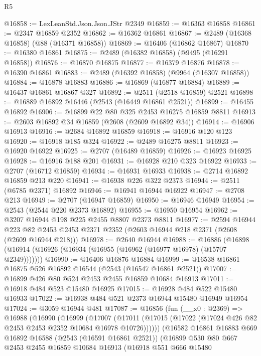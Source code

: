 \begin{lexlean}{R5}
\begin{coremodule}
@16858 := LexLeanStd.Json.Json.JStr @2349
@16859 := @16363 @16858
@16861 := @2347 @16859 @2352
@16862 := @16362 @16861
@16867 := @2489 (@16368 @16858) (@88 (@16371 @16858))
@16869 := @16406 (@16862 @16867)
@16870 := @16380 @16861
@16875 := @2489 (@16382 @16858) (@9495 (@16291 @16858))
@16876 := @16870 @16875
@16877 := @16379 @16876
@16878 := @16390 @16861
@16883 := @2489 (@16392 @16858) (@9964 (@16307 @16858))
@16884 := @16878 @16883
@16886 := @16869 (@16877 @16884)
@16889 := @16437 @16861 @16867 @327
@16892 := @2511 (@2518 @16859) @2521
@16898 := @16889 @16892 @16446 (@2543 (@16449 @16861 @2521))
@16899 := @16455 @16892
@16906 := @16899 @22 @80 @325 @2453 @16275 @16859 @8811
@16913 := @2603 @16892 @34 @16859 (@2608 (@2609 @16892 @34))
@16914 := @16906 @16913
@16916 := @2684 @16892 @16859
@16918 := @16916 @120 @123
@16920 := @16918 @185 @324
@16922 := @2489 @16275 @8811
@16923 := @16920 @16922
@16925 := @2707 (@16489 @16859)
@16926 := @16923 @16925
@16928 := @16916 @188 @201
@16931 := @16928 @210 @323 @16922
@16933 := @2707 (@16712 @16859)
@16934 := @16931 @16933
@16938 := @2714 @16892 @16859 @213 @220
@16941 := @16938 @226 @322 @2373
@16944 := @2511 (@6785 @2371) @16892
@16946 := @16941 @16944 @16922
@16947 := @2708 @213
@16949 := @2707 (@16947 @16859)
@16950 := @16946 @16949
@16954 := @2543 (@2544 @220 @2373 @16892)
@16955 := @16950 @16954
@16962 := @3207 @16944 @198 @225 @2455 @8807 @2373 @8811
@16977 := @2594
    @16944
    @223
    @82
    @2453
    @2453
    @2371
    @2352
    (@2603 @16944 @218 @2371 (@2608 (@2609 @16944 @218)))
@16978 := @2640 @16944
@16988 := @16886
    (@16898 (@16914 (@16926 (@16934 (@16955 (@16962 (@16977 @16978) (@15707 @2349)))))))
@16990 := @16406 @16876 @16884
@16999 := @16538 @16861 @16875 @526 @16892 @16544 (@2543 (@16547 @16861 @2521))
@17007 := @16899 @426 @80 @524 @2453 @2455 @16859 @10684 @16913
@17011 := @16918 @484 @523 @15480 @16925
@17015 := @16928 @484 @522 @15480 @16933
@17022 := @16938 @484 @521 @2373 @16944 @15480 @16949 @16954
@17024 := @3059 @16944 @481
@17087 := @16856
    (fun (__x0 : @2369) =>
    @16988
      (@16990
        (@16999
          (@17007
            (@17011 (@17015 (@17022 (@17024 @426 @82 @2453 @2453 @2352 @10684 @16978 @10726))))))
        (@16582
          @16861
          @16883
          @669
          @16892
          @16588
          (@2543 (@16591 @16861 @2521))
          (@16899
            @530
            @80
            @667
            @2453
            @2455
            @16859
            @10684
            @16913
            (@16918
              @551
              @666
              @15480

\end{coremodule}
\end{lexlean}
